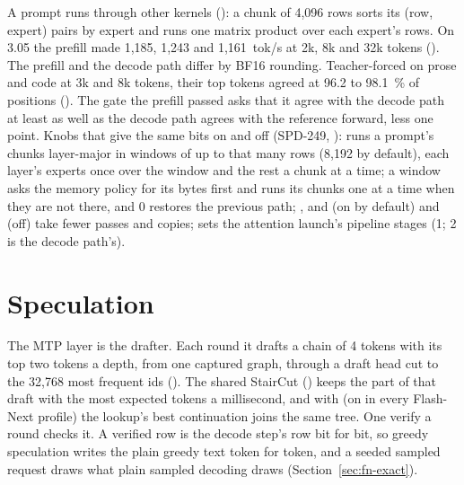A prompt runs through other kernels (): a chunk of 4,096 rows sorts its (row, expert) pairs by expert and runs one matrix product over each expert's rows. On 3.05 the prefill made 1,185, 1,243 and 1,161~tok/s at 2k, 8k and 32k tokens (\measured). The prefill and the decode path differ by BF16 rounding. Teacher-forced on prose and code at 3k and 8k tokens, their top tokens agreed at 96.2 to 98.1~\% of positions (\measured). The gate the prefill passed asks that it agree with the decode path at least as well as the decode path agrees with the reference forward, less one point. Knobs that give the same bits on and off (SPD-249, ):  runs a prompt's chunks layer-major in windows of up to that many rows (8,192 by default), each layer's experts once over the window and the rest a chunk at a time; a window asks the memory policy for its bytes first and runs its chunks one at a time when they are not there, and 0 restores the previous path; ,  and  (on by default) and  (off) take fewer passes and copies;  sets the attention launch's pipeline stages (1; 2 is the decode path's).

\section{Speculation}\label{sec:fn-spec}

The MTP layer is the drafter. Each round it drafts a chain of 4 tokens with its top two tokens a depth, from one captured graph, through a draft head cut to the 32,768 most frequent ids (). The shared StairCut () keeps the part of that draft with the most expected tokens a millisecond, and with  (on in every Flash-Next profile) the lookup's best continuation joins the same tree. One verify a round checks it. A verified row is the decode step's row bit for bit, so greedy speculation writes the plain greedy text token for token, and a seeded sampled request draws what plain sampled decoding draws (Section~\ref{sec:fn-exact}).

